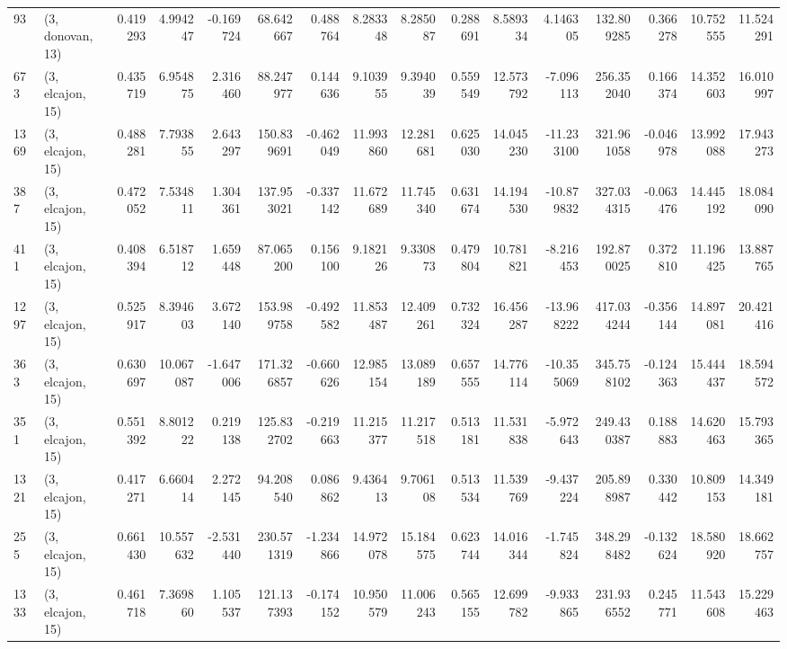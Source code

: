 \begin{tabular}{llrrrrrrrrrrrrrr}
93   &  (3, donovan, 13) &   0.419293 &   4.994247 &  -0.169724 &     68.642667 &    0.488764 &    8.283348 &    8.285087 &  0.288691 &   8.589334 &   4.146305 &   132.809285 &   0.366278 &  10.752555 &  11.524291 \\
673  &  (3, elcajon, 15) &   0.435719 &   6.954875 &   2.316460 &     88.247977 &    0.144636 &    9.103955 &    9.394039 &  0.559549 &  12.573792 &  -7.096113 &   256.352040 &   0.166374 &  14.352603 &  16.010997 \\
1369 &  (3, elcajon, 15) &   0.488281 &   7.793855 &   2.643297 &    150.839691 &   -0.462049 &   11.993860 &   12.281681 &  0.625030 &  14.045230 & -11.233100 &   321.961058 &  -0.046978 &  13.992088 &  17.943273 \\
387  &  (3, elcajon, 15) &   0.472052 &   7.534811 &   1.304361 &    137.953021 &   -0.337142 &   11.672689 &   11.745340 &  0.631674 &  14.194530 & -10.879832 &   327.034315 &  -0.063476 &  14.445192 &  18.084090 \\
411  &  (3, elcajon, 15) &   0.408394 &   6.518712 &   1.659448 &     87.065200 &    0.156100 &    9.182126 &    9.330873 &  0.479804 &  10.781821 &  -8.216453 &   192.870025 &   0.372810 &  11.196425 &  13.887765 \\
1297 &  (3, elcajon, 15) &   0.525917 &   8.394603 &   3.672140 &    153.989758 &   -0.492582 &   11.853487 &   12.409261 &  0.732324 &  16.456287 & -13.968222 &   417.034244 &  -0.356144 &  14.897081 &  20.421416 \\
363  &  (3, elcajon, 15) &   0.630697 &  10.067087 &  -1.647006 &    171.326857 &   -0.660626 &   12.985154 &   13.089189 &  0.657555 &  14.776114 & -10.355069 &   345.758102 &  -0.124363 &  15.444437 &  18.594572 \\
351  &  (3, elcajon, 15) &   0.551392 &   8.801222 &   0.219138 &    125.832702 &   -0.219663 &   11.215377 &   11.217518 &  0.513181 &  11.531838 &  -5.972643 &   249.430387 &   0.188883 &  14.620463 &  15.793365 \\
1321 &  (3, elcajon, 15) &   0.417271 &   6.660414 &   2.272145 &     94.208540 &    0.086862 &    9.436413 &    9.706108 &  0.513534 &  11.539769 &  -9.437224 &   205.898987 &   0.330442 &  10.809153 &  14.349181 \\
255  &  (3, elcajon, 15) &   0.661430 &  10.557632 &  -2.531440 &    230.571319 &   -1.234866 &   14.972078 &   15.184575 &  0.623744 &  14.016344 &  -1.745824 &   348.298482 &  -0.132624 &  18.580920 &  18.662757 \\
1333 &  (3, elcajon, 15) &   0.461718 &   7.369860 &   1.105537 &    121.137393 &   -0.174152 &   10.950579 &   11.006243 &  0.565155 &  12.699782 &  -9.933865 &   231.936552 &   0.245771 &  11.543608 &  15.229463 \\

\end{tabular}
